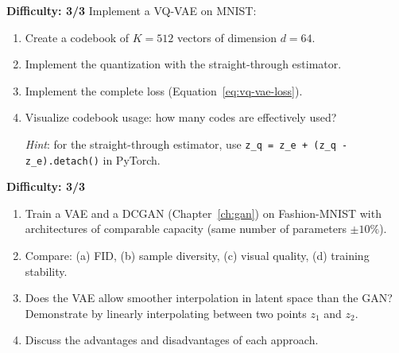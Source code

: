 \begin{exercise}
\label{exo:vq-vae-impl}
\textbf{Difficulty: 3/3}
Implement a VQ-VAE on MNIST:
\begin{enumerate}
    \item Create a codebook of $K=512$ vectors of dimension $d=64$.
    \item Implement the quantization with the straight-through estimator.
    \item Implement the complete loss (Equation~\eqref{eq:vq-vae-loss}).
    \item Visualize codebook usage: how many codes are effectively used?

\emph{Hint}: for the straight-through estimator, use \texttt{z\_q = z\_e + (z\_q - z\_e).detach()} in PyTorch.
\end{enumerate}
\end{exercise}

\begin{exercise}
\label{exo:vae-vs-gan}
\textbf{Difficulty: 3/3}
\begin{enumerate}
    \item Train a VAE and a DCGAN (Chapter~\ref{ch:gan}) on Fashion-MNIST with architectures of comparable capacity (same number of parameters $\pm 10\%$).
    \item Compare: (a) FID, (b) sample diversity, (c) visual quality, (d) training stability.
    \item Does the VAE allow smoother interpolation in latent space than the GAN? Demonstrate by linearly interpolating between two points $z_1$ and $z_2$.
    \item Discuss the advantages and disadvantages of each approach.
\end{enumerate}
\end{exercise}
